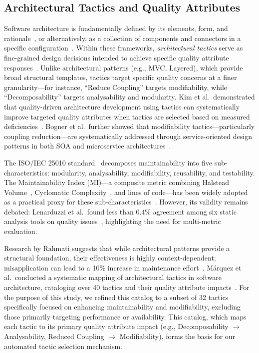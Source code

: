 \documentclass[sigconf,review,anonymous]{acmart}
\begin{document}
\subsection{Architectural Tactics and Quality Attributes}
Software architecture is fundamentally defined by its elements, form, and rationale~\cite{perry1992foundations}, or alternatively, as a collection of components and connectors in a specific configuration~\cite{garlan1993introduction}. Within these frameworks, \textit{architectural tactics} serve as fine-grained design decisions intended to achieve specific quality attribute responses~\cite{bass2021software}. Unlike architectural patterns (e.g., MVC, Layered), which provide broad structural templates, tactics target specific quality concerns at a finer granularity---for instance, ``Reduce Coupling'' targets modifiability, while ``Decomposability'' targets analysability and modularity. Kim et al.\ demonstrated that quality-driven architecture development using tactics can systematically improve targeted quality attributes when tactics are selected based on measured deficiencies~\cite{kim2009qualitydriven}. Bogner et al.\ further showed that modifiability tactics---particularly coupling reduction---are systematically addressed through service-oriented design patterns in both SOA and microservice architectures~\cite{bogner2019modifiability}.

The ISO/IEC 25010 standard~\cite{ISO25010} decomposes maintainability into five sub-characteristics: modularity, analysability, modifiability, reusability, and testability. The Maintainability Index (MI)---a composite metric combining Halstead Volume~\cite{halstead1977elements}, Cyclomatic Complexity~\cite{mccabe1976complexity}, and lines of code---has been widely adopted as a practical proxy for these sub-characteristics~\cite{oman1992maintainability}. However, its validity remains debated: Lenarduzzi et al.\ found less than 0.4\% agreement among six static analysis tools on quality issues~\cite{lenarduzzi2023critical}, highlighting the need for multi-metric evaluation.

Research by Rahmati suggests that while architectural patterns provide a structural foundation, their effectiveness is highly context-dependent; misapplication can lead to a 10\% increase in maintenance effort~\cite{rahmati2021ensuring}. M\'arquez et al.\ conducted a systematic mapping of architectural tactics in software architecture, cataloging over 40 tactics and their quality attribute impacts~\cite{marquez2022architectural}. For the purpose of this study, we refined this catalog to a subset of 32 tactics specifically focused on enhancing maintainability and modifiability, excluding those primarily targeting performance or availability. This catalog, which maps each tactic to its primary quality attribute impact (e.g., Decomposability $\rightarrow$ Analysability, Reduced Coupling $\rightarrow$ Modifiability), forms the basis for our automated tactic selection mechanism.
\end{document}
